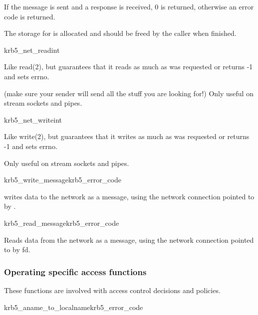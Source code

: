 If the message is sent and a response is received, 0 is returned,
otherwise an error code is returned.

The storage for  is allocated and should be freed by
the caller when finished.


\begin{funcdecl}{krb5_net_read}{int}{\funcin}
\funcout
{}
\funcin
{}
\end{funcdecl}

Like read(2), but guarantees that it reads as much as was requested
or returns -1 and sets errno.

(make sure your sender will send all the stuff you are looking for!)
Only useful on stream sockets and pipes.

\begin{funcdecl}{krb5_net_write}{int}{\funcin}
\end{funcdecl}

Like write(2), but guarantees that it writes as much as was requested
or returns -1 and sets errno.

Only useful on stream sockets and pipes.

\begin{funcdecl}{krb5_write_message}{krb5_error_code}{\funcin}
\end{funcdecl}


 writes data to the network as a message,
using the network connection pointed to by .

\begin{funcdecl}{krb5_read_message}{krb5_error_code}{\funcin}
\funcout
{}
\end{funcdecl}

Reads data from the network as a message, using the network connection
pointed to by fd.

\subsubsection{Operating specific access functions}
These functions are involved with access control decisions and policies.

\begin{funcdecl}{krb5_aname_to_localname}{krb5_error_code}{\funcin}
\funcout
{}
\end{funcdecl}

